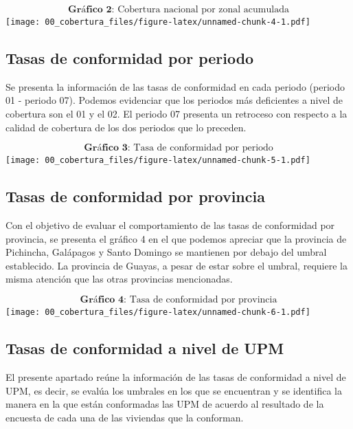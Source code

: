 \documentclass[
]{article}
\begin{document}
\[\textbf{Gráfico 2:}\text{ Cobertura nacional por zonal acumulada}\]
\texttt{[image: 00\_cobertura\_files/figure-latex/unnamed-chunk-4-1.pdf]}

\newpage
\vspace{-1truemm}

\hypertarget{tasas-de-conformidad-por-periodo}{%
\subsection{Tasas de conformidad por
periodo}\label{tasas-de-conformidad-por-periodo}}

Se presenta la información de las tasas de conformidad en cada periodo
(periodo 01 - periodo 07). Podemos evidenciar que los periodos más
deficientes a nivel de cobertura son el 01 y el 02. El periodo 07
presenta un retroceso con respecto a la calidad de cobertura de los dos
periodos que lo preceden.

\[\textbf{Gráfico 3:}\text{ Tasa de conformidad por periodo}\]
\texttt{[image: 00\_cobertura\_files/figure-latex/unnamed-chunk-5-1.pdf]}

\hypertarget{tasas-de-conformidad-por-provincia}{%
\subsection{Tasas de conformidad por
provincia}\label{tasas-de-conformidad-por-provincia}}

Con el objetivo de evaluar el comportamiento de las tasas de conformidad
por provincia, se presenta el gráfico 4 en el que podemos apreciar que
la provincia de Pichincha, Galápagos y Santo Domingo se mantienen por
debajo del umbral establecido. La provincia de Guayas, a pesar de estar
sobre el umbral, requiere la misma atención que las otras provincias
mencionadas.

\[\textbf{Gráfico 4:}\text{ Tasa de conformidad por provincia}\]
\texttt{[image: 00\_cobertura\_files/figure-latex/unnamed-chunk-6-1.pdf]}
\newpage

\hypertarget{tasas-de-conformidad-a-nivel-de-upm}{%
\subsection{Tasas de conformidad a nivel de
UPM}\label{tasas-de-conformidad-a-nivel-de-upm}}

El presente apartado reúne la información de las tasas de conformidad a
nivel de UPM, es decir, se evalúa los umbrales en los que se encuentran
y se identifica la manera en la que están conformadas las UPM de acuerdo
al resultado de la encuesta de cada una de las viviendas que la
conforman.
\end{document}
